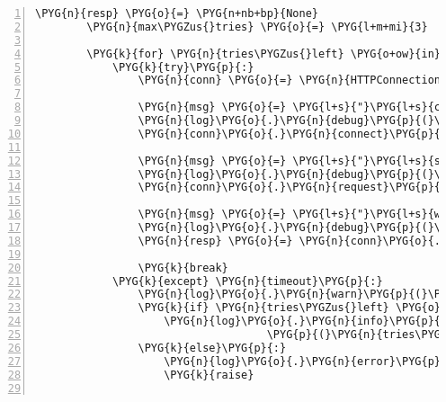 \begin{Verbatim}[commandchars=\\\{\},numbers=left,firstnumber=1,stepnumber=5]
        \PYG{n}{resp} \PYG{o}{=} \PYG{n+nb+bp}{None}
        \PYG{n}{max\PYGZus{}tries} \PYG{o}{=} \PYG{l+m+mi}{3}

        \PYG{k}{for} \PYG{n}{tries\PYGZus{}left} \PYG{o+ow}{in} \PYG{n+nb}{reversed}\PYG{p}{(}\PYG{n+nb}{range}\PYG{p}{(}\PYG{n}{max\PYGZus{}tries}\PYG{p}{)}\PYG{p}{)}\PYG{p}{:}
            \PYG{k}{try}\PYG{p}{:}
                \PYG{n}{conn} \PYG{o}{=} \PYG{n}{HTTPConnection}\PYG{p}{(}\PYG{n}{url\PYGZus{}parts}\PYG{o}{.}\PYG{n}{netloc}\PYG{p}{,} \PYG{n}{strict}\PYG{o}{=}\PYG{n+nb+bp}{True}\PYG{p}{,} \PYG{n}{timeout}\PYG{o}{=}\PYG{l+m+mi}{60}\PYG{p}{)}

                \PYG{n}{msg} \PYG{o}{=} \PYG{l+s}{"}\PYG{l+s}{connecting to server}\PYG{l+s}{"}
                \PYG{n}{log}\PYG{o}{.}\PYG{n}{debug}\PYG{p}{(}\PYG{n}{msg}\PYG{p}{)}
                \PYG{n}{conn}\PYG{o}{.}\PYG{n}{connect}\PYG{p}{(}\PYG{p}{)}

                \PYG{n}{msg} \PYG{o}{=} \PYG{l+s}{"}\PYG{l+s}{sending GET request}\PYG{l+s}{"}
                \PYG{n}{log}\PYG{o}{.}\PYG{n}{debug}\PYG{p}{(}\PYG{n}{msg}\PYG{p}{)}
                \PYG{n}{conn}\PYG{o}{.}\PYG{n}{request}\PYG{p}{(}\PYG{l+s}{"}\PYG{l+s}{GET}\PYG{l+s}{"}\PYG{p}{,} \PYG{n}{url\PYGZus{}parts}\PYG{o}{.}\PYG{n}{path}\PYG{p}{)}

                \PYG{n}{msg} \PYG{o}{=} \PYG{l+s}{"}\PYG{l+s}{waiting for response from server}\PYG{l+s}{"}
                \PYG{n}{log}\PYG{o}{.}\PYG{n}{debug}\PYG{p}{(}\PYG{n}{msg}\PYG{p}{)}
                \PYG{n}{resp} \PYG{o}{=} \PYG{n}{conn}\PYG{o}{.}\PYG{n}{getresponse}\PYG{p}{(}\PYG{p}{)}

                \PYG{k}{break}
            \PYG{k}{except} \PYG{n}{timeout}\PYG{p}{:}
                \PYG{n}{log}\PYG{o}{.}\PYG{n}{warn}\PYG{p}{(}\PYG{l+s}{"}\PYG{l+s}{timeout }\PYG{l+s}{"} \PYG{o}{+} \PYG{n}{msg}\PYG{p}{)}
                \PYG{k}{if} \PYG{n}{tries\PYGZus{}left} \PYG{o}{\textgreater{}} \PYG{l+m+mi}{0}\PYG{p}{:}
                    \PYG{n}{log}\PYG{o}{.}\PYG{n}{info}\PYG{p}{(}\PYG{l+s}{"}\PYG{l+s}{trying }\PYG{l+s+si}{\PYGZpc{}d}\PYG{l+s}{ more time}\PYG{l+s+si}{\PYGZpc{}s}\PYG{l+s}{"} \PYG{o}{\PYGZpc{}}
                                    \PYG{p}{(}\PYG{n}{tries\PYGZus{}left}\PYG{p}{,} \PYG{n}{tries\PYGZus{}left} \PYG{o}{\textgreater{}} \PYG{l+m+mi}{1} \PYG{o+ow}{and} \PYG{l+s}{'}\PYG{l+s}{s}\PYG{l+s}{'} \PYG{o+ow}{or} \PYG{l+s}{'}\PYG{l+s}{'}\PYG{p}{)}\PYG{p}{)}
                \PYG{k}{else}\PYG{p}{:}
                    \PYG{n}{log}\PYG{o}{.}\PYG{n}{error}\PYG{p}{(}\PYG{l+s}{"}\PYG{l+s}{tried }\PYG{l+s+si}{\PYGZpc{}d}\PYG{l+s}{ times - giving up}\PYG{l+s}{"}\PYG{p}{,} \PYG{n}{max\PYGZus{}tries}\PYG{p}{)}
                    \PYG{k}{raise}


\end{Verbatim}
